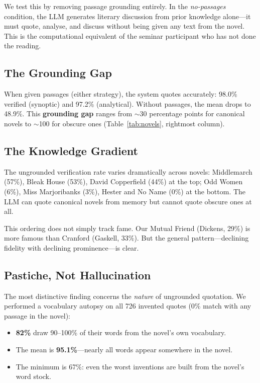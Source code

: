 \documentclass[final]{clv2025}
\begin{document}
We test this by removing passage grounding entirely.  In the
\emph{no-passages} condition, the LLM generates literary discussion
from prior knowledge alone---it must quote, analyse, and discuss
without being given any text from the novel.  This is the computational
equivalent of the seminar participant who has not done the reading.

\subsection{The Grounding Gap}

When given passages (either strategy), the system quotes accurately:
98.0\% verified (synoptic) and 97.2\% (analytical).  Without passages,
the mean drops to 48.9\%.  This \textbf{grounding gap} ranges from
$\sim$30 percentage points for canonical novels to $\sim$100 for
obscure ones (Table~\ref{tab:novels}, rightmost column).

\subsection{The Knowledge Gradient}

The ungrounded verification rate varies dramatically across novels:
Middlemarch (57\%), Bleak House (53\%), David Copperfield (44\%) at the
top; Odd Women (6\%), Miss Marjoribanks (3\%), Hester and No Name
(0\%) at the bottom.  The LLM can quote canonical novels from memory
but cannot quote obscure ones at all.

This ordering does not simply track fame.  Our Mutual Friend (Dickens,
29\%) is more famous than Cranford (Gaskell, 33\%).  But the general
pattern---declining fidelity with declining prominence---is clear.

\subsection{Pastiche, Not Hallucination}

The most distinctive finding concerns the \emph{nature} of ungrounded
quotation.  We performed a vocabulary autopsy on all 726 invented
quotes (0\% match with any passage in the novel):

\begin{itemize}
\item \textbf{82\%} draw 90--100\% of their words from the novel's own
vocabulary.
\item The mean is \textbf{95.1\%}---nearly all words appear somewhere
in the novel.
\item The minimum is 67\%: even the worst inventions are built from the
novel's word stock.
\end{itemize}
\end{document}
